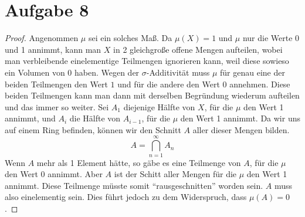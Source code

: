 \documentclass[10pt,a4paper]{article}
\begin{document}
\section{Aufgabe 8}
\begin{proof}
  Angenommen $\mu$ sei ein solches Maß.
  Da $\mu(X) = 1$ und $\mu$ nur die Werte 0 und 1 annimmt, kann man $X$ in 2 gleichgroße offene Mengen aufteilen, wobei man verbleibende einelementige Teilmengen ignorieren kann, weil diese sowieso ein Volumen von 0 haben.
  Wegen der $\sigma$-Additivität muss $\mu$ für genau eine der beiden Teilmengen den Wert $1$ und für die andere den Wert $0$ annehmen.
  Diese beiden Teilmengen kann man dann mit derselben Begründung wiederum aufteilen und das immer so weiter.
  Sei $A_{1}$ diejenige Hälfte von $X$, für die $\mu$ den Wert 1 annimmt, und $A_{i}$ die Hälfte von $A_{i - 1}$, für die $\mu$ den Wert 1 annimmt.
  Da wir uns auf einem Ring befinden, können wir den Schnitt $A$ aller dieser Mengen bilden.
  \begin{equation}
    A = \bigcap_{n = 1}^{\infty} A_{n}
  \end{equation}
  Wenn $A$ mehr als 1 Element hätte, so gäbe es eine Teilmenge von $A$, für die $\mu$ den Wert $0$ annimmt.
  Aber $A$ ist der Schitt aller Mengen für die $\mu$ den Wert 1 annimmt.
  Diese Teilmenge müsste somit ``rausgeschnitten'' worden sein.
  $A$ muss also einelementig sein.
  Dies führt jedoch zu dem Widerspruch, dass $\mu(A) = 0$.
\end{proof}
\end{document}
